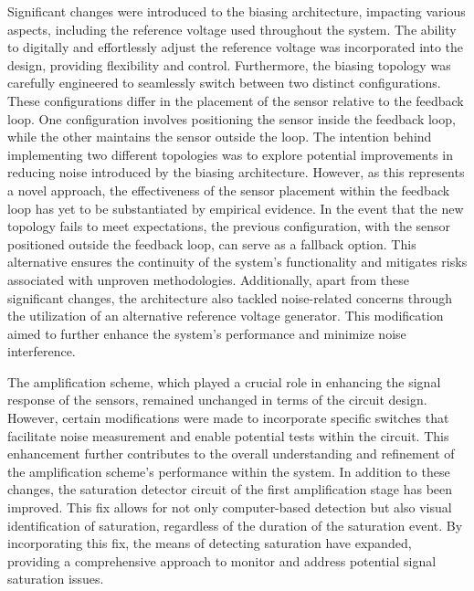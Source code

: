 Significant changes were introduced to the biasing architecture, impacting various aspects, including the reference voltage used throughout the system. The ability to digitally and effortlessly adjust the reference voltage was incorporated into the design, providing flexibility and control. Furthermore, the biasing topology was carefully engineered to seamlessly switch between two distinct configurations. These configurations differ in the placement of the sensor relative to the feedback loop. One configuration involves positioning the sensor inside the feedback loop, while the other maintains the sensor outside the loop. The intention behind implementing two different topologies was to explore potential improvements in reducing noise introduced by the biasing architecture. However, as this represents a novel approach, the effectiveness of the sensor placement within the feedback loop has yet to be substantiated by empirical evidence. In the event that the new topology fails to meet expectations, the previous configuration, with the sensor positioned outside the feedback loop, can serve as a fallback option. This alternative ensures the continuity of the system's functionality and mitigates risks associated with unproven methodologies. Additionally, apart from these significant changes, the architecture also tackled noise-related concerns through the utilization of an alternative reference voltage generator. This modification aimed to further enhance the system's performance and minimize noise interference.

The amplification scheme, which played a crucial role in enhancing the signal response of the sensors, remained unchanged in terms of the circuit design. However, certain modifications were made to incorporate specific switches that facilitate noise measurement and enable potential tests within the circuit. This enhancement further contributes to the overall understanding and refinement of the amplification scheme's performance within the system. In addition to these changes, the saturation detector circuit of the first amplification stage has been improved. This fix allows for not only computer-based detection but also visual identification of saturation, regardless of the duration of the saturation event. By incorporating this fix, the means of detecting saturation have expanded, providing a comprehensive approach to monitor and address potential signal saturation issues.

